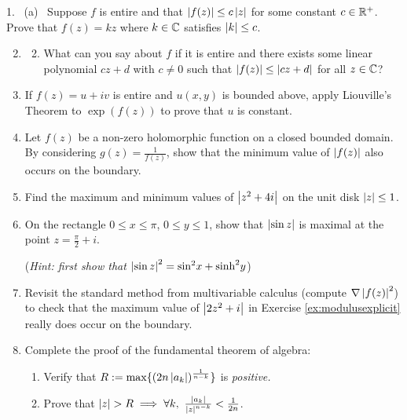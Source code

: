  
\begin{exercises*}
\hangindent\doubleind
\textup{1.} \ (a) \ Suppose $f$ is entire and that $\left| f(z)\right|\le c\left| z\right|$ for some constant $c\in\mathbb{R}^+$. Prove that $f(z)=kz$ where $k\in\mathbb{C}$ satisfies $\left| k\right|\le c$.
\begin{enumerate}\setcounter{enumi}{1} 
  \item[]\begin{enumerate}\setcounter{enumii}{1} 
    \item What can you say about $f$ if it is entire and there exists some linear polynomial $cz+d$ with $c\neq 0$ such that $\left| f(z)\right|\le\left| cz+d\right|$ for all $z\in\mathbb{C}$?
  \end{enumerate}
  
  \item If $f(z)=u+iv$ is entire and $u(x,y)$ is bounded above, apply Liouville's Theorem to $\exp(f(z))$ to prove that $u$ is constant.
  
  \item Let $f(z)$ be a non-zero holomorphic function on a closed bounded domain. By considering $g(z)=\frac 1{f(z)}$, show that the minimum value of $\left| f(z)\right|$ also occurs on the boundary.
  
  \item Find the maximum and minimum values of $\left| z^2+4i\right|$ on the unit disk $\left| z\right|\le 1$.
  
  \item On the rectangle $0\le x\le\pi$, $0\le y\le 1$, show that $\left| \sin z\right|$ is maximal at the point $z=\frac\pi 2+i$.\par
  (\emph{Hint: first show that $\left| \sin z\right|^2=\sin^2\!x+\sinh^2\!y$})
  
  \item Revisit the standard method from multivariable calculus (compute $\nabla\left| f(z)\right|^2$) to check that the maximum value of $\left| 2z^2+i\right|$ in Exercise \ref{ex:modulusexplicit} really does occur on the boundary.

  \item Complete the proof of the fundamental theorem of algebra: 
  \begin{enumerate}
    \item Verify that $R:=\max\{(2n\left| a_k\right|)^{\frac 1{n-k}}\}$ is \emph{positive.}
    \item Prove that $\nm z>R\implies \forall k,\ \frac{\nm{a_k}}{\nm z^{n-k}}<\frac 1{2n}$.
  \end{enumerate}
    

\end{enumerate}
\end{exercises*}
